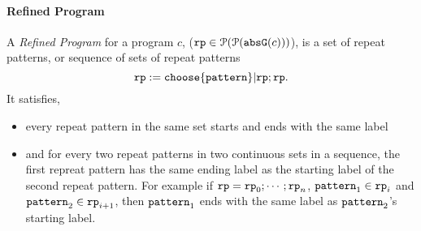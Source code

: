 \paragraph{Refined Program}
A \emph{Refined Program} for a program $c$, ($\mathtt{rp} \in \mathcal{P}(\mathcal{P}(\mathtt{abs}{\mathtt{G}}(c)))$),
is a set of repeat patterns, or sequence of sets of  repeat patterns
\[
  \rprog :=  \rpchoose{\rpattern}| \rprog; \rprog.
\]
It satisfies,
\begin{itemize}
  \item every repeat pattern in the same set starts and ends with the same label
  \item and for every two repeat patterns in two continuous sets in a sequence, the first repreat pattern has the same ending label
    as the starting label of the second repeat pattern.
    For example if
    $\mathtt{rp} = \mathtt{rp}_0; \cdots; \mathtt{rp}_n$, $\mathtt{pattern}_1 \in \mathtt{rp}_i$ and $\mathtt{pattern}_2 \in \mathtt{rp}_{i + 1}$,
    then $\mathtt{pattern}_1$ ends with the same label as $\mathtt{pattern}_2$'s starting label.
\end{itemize}
%

